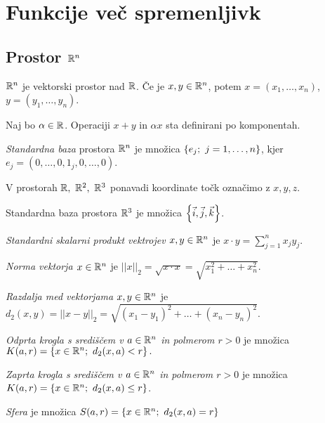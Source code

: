 \section{Funkcije več spremenljivk}
\subsection{Prostor $\mathbb{R}^n$}
$\mathbb{R}^n$ je vektorski prostor nad $\mathbb{R}$. 
Če je $x, y \in \mathbb{R}^n$, potem $x = (x_1, \ldots, x_n)$, $y = (y_1, \ldots, y_n)$. 

Naj bo $\alpha \in \mathbb{R}$. Operaciji $x+y$ in $\alpha x$ sta definirani po komponentah.

\begin{definicija}
    \emph{Standardna baza} prostora $\mathbb{R}^n$ je množica $\left\{e_j; \ j = 1, \ldots, n\right\}$, kjer $\displaystyle e_j = (0, \ldots, 0, 1_j , 0, \ldots, 0)$.
\end{definicija}

\begin{opomba}
    V prostorah $\mathbb{R}, \ \mathbb{R}^2, \ \mathbb{R}^3$ ponavadi koordinate točk označimo z $x, y, z$.
\end{opomba}

\begin{definicija}
    Standardna baza prostora $\mathbb{R}^3$ je množica $\left\{\vec{i}, \vec{j}, \vec{k}\right\}$.
\end{definicija}

\begin{definicija}
    \emph{Standardni skalarni produkt vektrojev $x, y \in \mathbb{R}^n$} je $x \cdot y = \sum_{j=1}^{n} x_jy_j$.

    \emph{Norma vektorja $x \in \mathbb{R}^n$} je  $||x||_2= \sqrt{x \cdot x} = \sqrt{x_1^2+\ldots+x_n^2}$.

    \emph{Razdalja med vektorjama $x, y \in \mathbb{R}^n$} je $d_2(x,y) = ||x-y||_2 = \sqrt{(x_1-y_1)^2 + \ldots + (x_n - y_n)^2}$.
\end{definicija}

\begin{definicija}
    \emph{Odprta krogla s središčem v $a \in \mathbb{R}^n$ in polmerom $r>0$} je množica $K(a, r) = \set{x \in \RR^n; \ d_2(x,a)<r}.$

    \emph{Zaprta krogla s središčem v $a \in \mathbb{R}^n$ in polmerom $r>0$} je množica $K(a, r) = \set{x \in \RR^n; \ d_2(x,a) \leq r}$.

    \emph{Sfera} je množica $S(a,r) = \left\{x \in \mathbb{R}^n; \ d_2(x,a) = r\right\}$
\end{definicija}

